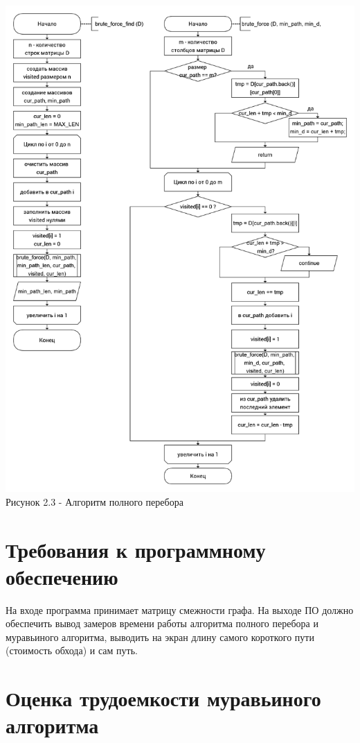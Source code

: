 \documentclass[12pt]{report}
\begin{document}
\begin{center}
	\label{img:vin_opt} 
	\includegraphics[scale = 0.3]{brute} \\ Рисунок 2.3 - Алгоритм полного перебора
\end{center}


\section{Требования к программному обеспечению}

На входе программа принимает матрицу смежности графа. На выходе ПО должно обеспечить вывод замеров времени работы алгоритма полного перебора и муравьиного алгоритма, выводить на экран длину самого короткого пути (стоимость обхода) и сам путь.

\section{Оценка трудоемкости муравьиного алгоритма}
\end{document}
